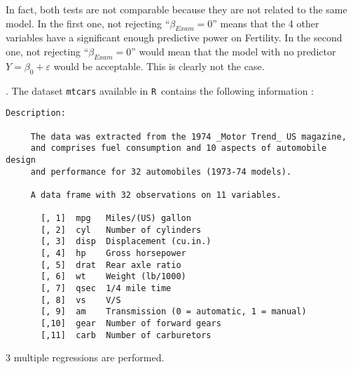 \documentclass[12pt]{article}
\newcommand \noi \noindent
\newcommand{\R}{\texttt{R}}
\def\vs1{\vspace{1mm}}
\begin{document}
\begin{enumerate}
\vs1

In fact, both tests are not comparable because they are not related to the same model. In the first one, not rejecting ``$\beta_{Exam} = 0$'' means that the 4 other variables have a significant enough predictive power on Fertility. In the second one, not rejecting ``$\beta_{Exam} = 0$'' would mean that the model with no predictor $Y = \beta_0 + \varepsilon$ would be acceptable. This is clearly not the case. 



\end{enumerate}



\vspace{5mm}

\noi{\bf Exercise 3}. The dataset \texttt{mtcars} available in \R\ contains the following information :

\begin{verbatim}
Description:

     The data was extracted from the 1974 _Motor Trend_ US magazine,
     and comprises fuel consumption and 10 aspects of automobile design
     and performance for 32 automobiles (1973-74 models).

     A data frame with 32 observations on 11 variables.

       [, 1]  mpg   Miles/(US) gallon                        
       [, 2]  cyl   Number of cylinders                      
       [, 3]  disp  Displacement (cu.in.)                    
       [, 4]  hp    Gross horsepower                         
       [, 5]  drat  Rear axle ratio                          
       [, 6]  wt    Weight (lb/1000)                         
       [, 7]  qsec  1/4 mile time                            
       [, 8]  vs    V/S                                      
       [, 9]  am    Transmission (0 = automatic, 1 = manual) 
       [,10]  gear  Number of forward gears                  
       [,11]  carb  Number of carburetors
\end{verbatim}



3 multiple regressions are performed.
\end{document}
